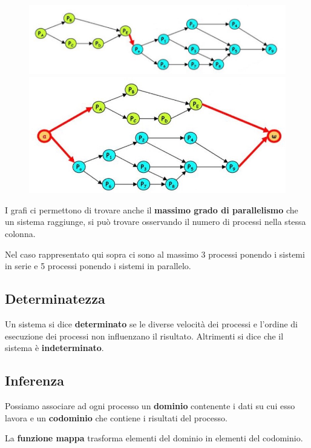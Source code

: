 \begin{figure}[H]
    \centering
    \begin{minipage}{0.45\textwidth}
        \centering
        \includegraphics[width=\linewidth]{assets/sistema-serie.jpg}
    \end{minipage}
    \hfill
    \begin{minipage}{0.45\textwidth}
        \centering
        \includegraphics[width=\linewidth]{assets/sistema-parallelo.jpg}
    \end{minipage}
\end{figure}

\begin{note}
    I grafi ci permettono di trovare anche il \textbf{massimo grado di parallelismo} che un sistema raggiunge, si può trovare osservando il numero di processi nella stessa colonna.

    Nel caso rappresentato qui sopra ci sono al massimo 3 processi ponendo i sistemi in serie e 5 processi ponendo i sistemi in parallelo.
\end{note}

\subsection{Determinatezza}

Un sistema si dice \textbf{determinato} se le diverse velocità dei processi e l'ordine di esecuzione dei processi non influenzano il risultato.
Altrimenti si dice che il sistema è \textbf{indeterminato}.

\subsection{Inferenza}
\begin{note}
    Possiamo associare ad ogni processo un \textbf{dominio} contenente i dati su cui esso lavora e un \textbf{codominio} che contiene i risultati del processo.

    La \textbf{funzione mappa} trasforma elementi del dominio in elementi del codominio.
\end{note}

